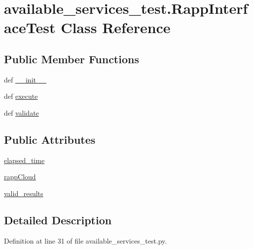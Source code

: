\hypertarget{classavailable__services__test_1_1RappInterfaceTest}{\section{available\-\_\-services\-\_\-test.\-Rapp\-Interface\-Test Class Reference}
\label{classavailable__services__test_1_1RappInterfaceTest}
}
\subsection*{Public Member Functions}
\begin{DoxyCompactItemize}
\item 
def \hyperlink{classavailable__services__test_1_1RappInterfaceTest_aea57d25a7e6cfb4823655dd1a3d8862e}{\-\_\-\-\_\-init\-\_\-\-\_\-}
\item 
def \hyperlink{classavailable__services__test_1_1RappInterfaceTest_a42706fc4dd1650b68edb13e1210ad153}{execute}
\item 
def \hyperlink{classavailable__services__test_1_1RappInterfaceTest_a8a8ad80afbf2df1f23bebb10f918c7fa}{validate}
\end{DoxyCompactItemize}
\subsection*{Public Attributes}
\begin{DoxyCompactItemize}
\item 
\hyperlink{classavailable__services__test_1_1RappInterfaceTest_ab627f960db9bf77ab2b5723f94182fbb}{elapsed\-\_\-time}
\item 
\hyperlink{classavailable__services__test_1_1RappInterfaceTest_a4ebc23a9b54174cbd771d6b34d2df5bd}{rapp\-Cloud}
\item 
\hyperlink{classavailable__services__test_1_1RappInterfaceTest_a7d46f89a829e4ab01e82a21b905b4e91}{valid\-\_\-results}
\end{DoxyCompactItemize}


\subsection{Detailed Description}


Definition at line 31 of file available\-\_\-services\-\_\-test.\-py.




